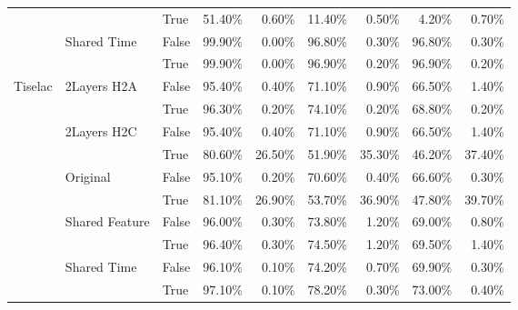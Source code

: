 \begin{tabular}{lllrrrrrr}
 &  & True & 51.40\% & 0.60\% & 11.40\% & 0.50\% & 4.20\% & 0.70\% \\
\cline{2-9}
 & \multirow[t]{2}{*}{Shared Time} & False & 99.90\% & 0.00\% & 96.80\% & 0.30\% & 96.80\% & 0.30\% \\
 &  & True & 99.90\% & 0.00\% & 96.90\% & 0.20\% & 96.90\% & 0.20\% \\
\cline{1-9} \cline{2-9}
\multirow[t]{10}{*}{Tiselac} & \multirow[t]{2}{*}{2Layers H2A} & False & 95.40\% & 0.40\% & 71.10\% & 0.90\% & 66.50\% & 1.40\% \\
 &  & True & 96.30\% & 0.20\% & 74.10\% & 0.20\% & 68.80\% & 0.20\% \\
\cline{2-9}
 & \multirow[t]{2}{*}{2Layers H2C} & False & 95.40\% & 0.40\% & 71.10\% & 0.90\% & 66.50\% & 1.40\% \\
 &  & True & 80.60\% & 26.50\% & 51.90\% & 35.30\% & 46.20\% & 37.40\% \\
\cline{2-9}
 & \multirow[t]{2}{*}{Original} & False & 95.10\% & 0.20\% & 70.60\% & 0.40\% & 66.60\% & 0.30\% \\
 &  & True & 81.10\% & 26.90\% & 53.70\% & 36.90\% & 47.80\% & 39.70\% \\
\cline{2-9}
 & \multirow[t]{2}{*}{Shared Feature} & False & 96.00\% & 0.30\% & 73.80\% & 1.20\% & 69.00\% & 0.80\% \\
 &  & True & 96.40\% & 0.30\% & 74.50\% & 1.20\% & 69.50\% & 1.40\% \\
\cline{2-9}
 & \multirow[t]{2}{*}{Shared Time} & False & 96.10\% & 0.10\% & 74.20\% & 0.70\% & 69.90\% & 0.30\% \\
 &  & True & 97.10\% & 0.10\% & 78.20\% & 0.30\% & 73.00\% & 0.40\% \\
\cline{1-9} \cline{2-9}
\bottomrule
\end{tabular}

